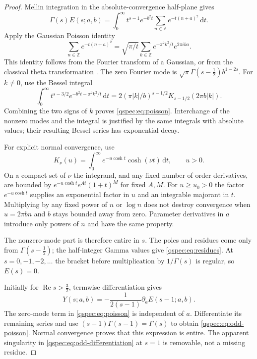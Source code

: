 \documentclass[11pt,letterpaper]{article}
\numberwithin{equation}{section}
\theoremstyle{definition}
\newcommand{\Rea}{\operatorname{Re}}
\newcommand{\dd}{\,\mathrm{d}}
\newcommand{\Z}{\mathbb Z}
\begin{document}
\begin{proof}
Mellin integration in the absolute-convergence half-plane gives
\[
\Gamma(s)E(s;a,b)
=\int_0^\infty t^{s-1}e^{-b^2t}
\sum_{n\in\Z}e^{-t(n+a)^2}\dd t.
\]
Apply the Gaussian Poisson identity
\[
\sum_{n\in\Z}e^{-t(n+a)^2}
=\sqrt{\pi/t}\sum_{k\in\Z}e^{-\pi^2k^2/t}e^{2\pi ika}.
\]
This identity follows from the Fourier transform of a Gaussian, or from
the classical theta transformation \cite{theta}. The zero Fourier mode
is $\sqrt\pi\Gamma(s-\tfrac12)b^{1-2s}$. For $k\ne0$, use the
Bessel integral \cite{bessel}
\[
\int_0^\infty t^{s-3/2}e^{-b^2t-\pi^2k^2/t}\dd t
=2(\pi|k|/b)^{s-1/2}K_{s-1/2}(2\pi b|k|).
\]
Combining the two signs of $k$ proves \eqref{qspec:eq:poisson}.
Interchange of the nonzero modes and the integral is justified by the
same integrals with absolute values; their resulting Bessel series has
exponential decay.

For explicit normal convergence, use
\begin{equation}\label{qspec:eq:K-cosh}
K_\nu(u)=\int_0^\infty e^{-u\cosh t}\cosh(\nu t)\dd t,
\qquad u>0.
\end{equation}
On a compact set of $\nu$ the integrand, and any fixed number of order
derivatives, are bounded by $e^{-u\cosh t}e^{A t}(1+t)^M$ for fixed
$A,M$. For $u\ge u_0>0$ the factor $e^{-u\cosh t}$ supplies an
exponential factor in $u$ and an integrable majorant in $t$. Multiplying
by any fixed power of $n$ or $\log n$ does not destroy convergence when
$u=2\pi bn$ and $b$ stays bounded away from zero. Parameter derivatives
in $a$ introduce only powers of $n$ and have the same property.

The nonzero-mode part is therefore entire in $s$. The poles and residues
come only from $\Gamma(s-\tfrac12)$; the half-integer Gamma values give
\eqref{qspec:eq:residues}. At $s=0,-1,-2,\ldots$ the bracket before
multiplication by $1/\Gamma(s)$ is regular, so $E(s)=0$.

Initially for $\Rea s>\tfrac32$, termwise differentiation gives
\begin{equation}\label{qspec:eq:odd-differentiation}
Y(s;a,b)=-\frac1{2(s-1)}\partial_a E(s-1;a,b).
\end{equation}
The zero-mode term in \eqref{qspec:eq:poisson} is independent of $a$.
Differentiate its remaining series and use
$(s-1)\Gamma(s-1)=\Gamma(s)$ to obtain
\eqref{qspec:eq:odd-poisson}. Normal convergence proves that this expression
is entire. The apparent singularity in \eqref{qspec:eq:odd-differentiation}
at $s=1$ is removable, not a missing residue.
\end{proof}
\end{document}
